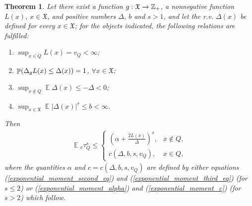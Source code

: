\documentclass[10pt, reqno]{amsart}
\newtheorem{repeated_theorem}{Theorem}
\theoremstyle{definition}
\newcommand{\aasVar}{Q} %
\newcommand{\astVar}{\tau} %
\newcommand{\ltfVar}{L} %
\newcommand{\assVar}{\mathfrak{X}} %
\newcommand{\integers}{\mathbb{Z}} %
\newcommand{\absolute}[1]{\left|#1\right|}
\DeclareMathOperator*{\E}{\mathbb{E}}
\DeclareMathOperator*{\Pb}{\mathbb{P}}
\begin{document}
	\begin{repeated_theorem}
		Let there exist a function $\gffVar:\assVar \xrightarrow{} \integers_{+}$, a nonnegative function $\ltfVar(x)$, $x \in \assVar$, and positive numbers $\Delta$, $b$ and $s > 1$, and let the r.v. $\Delta(x)$ be defined for every $x \in \assVar$; for the objects indicated, the following relations are fulfilled:
		\begin{enumerate}
			\item[(a)] $\sup_{x \in \aasVar}\ltfVar(x) = v_{\aasVar} < \infty$;
			\item[(b)] $\Pb(\Delta_{\gffVar}\ltfVar(x) \leq \Delta(x)) = 1$, $\forall x \in \assVar$;
			\item[(c)] $\sup_{x \notin \aasVar}\E\Delta(x) \leq -\Delta < 0$;
			\item[(d)] $\sup_{x \in \assVar}\E\absolute{\Delta(x)}^{s} \leq b < \infty$.
		\end{enumerate}
		Then
		\begin{align}
		\E{}_{x}\astVar_{\aasVar}^{s} \leq \begin{cases}
		\left(\alpha + \frac{2\ltfVar(x)}{\Delta}\right)^{s}, & x \notin \aasVar,\\
		c(\Delta, b, s, v_{\aasVar}), & x \in \aasVar,
		\end{cases}
		\label{exponential_moment_result_estimation}
		\end{align}
		where the quantities $\alpha$ and $c = c(\Delta, b, s, v_{\aasVar})$ are defined by either equations (\ref{exponential_moment_second_eq}) and (\ref{exponential_moment_third_eq}) (for $s \leq 2$) or (\ref{exponential_moment_alpha}) and (\ref{exponential_moment_c}) (for $s > 2$) which follow.
		\label{Exponential_moment_theorem}
	\end{repeated_theorem}
	
\end{document}
